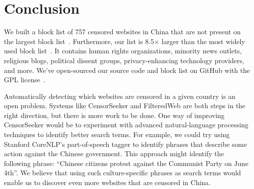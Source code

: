 
\section{Conclusion}
We built a block list of 757 censored websites in China that are not
present on the largest block
list~\cite{darer2017filteredweb}. Furthermore, our list is 8.5$\times$
larger than the most widely used block
list~\cite{citizenlab:block}. It contains human rights organizations,
minority news outlets, religious blogs, political dissent groups,
privacy-enhancing technology providers, and more. We've open-sourced
our source code and block list on GitHub with the GPL
license~\cite{censorsearch-lists}.

Automatically detecting which websites are censored in a given country is an
open problem. Systems like CensorSeeker and FilteredWeb are both steps in the
right direction, but there is more work to be done.  One way of improving
CensorSeeker would be to experiment with advanced natural-language processing
techniques to identify better search terms. For example, we could try using
Stanford CoreNLP's part-of-speech tagger to identify phrases that describe
some action against the Chinese government. This approach might
identify the following phrase: ``Chinese citizens protest against the Communist Party on June
4th''. We believe that using such culture-specific phrases as search terms
would enable us to discover even more websites that are censored in China.

